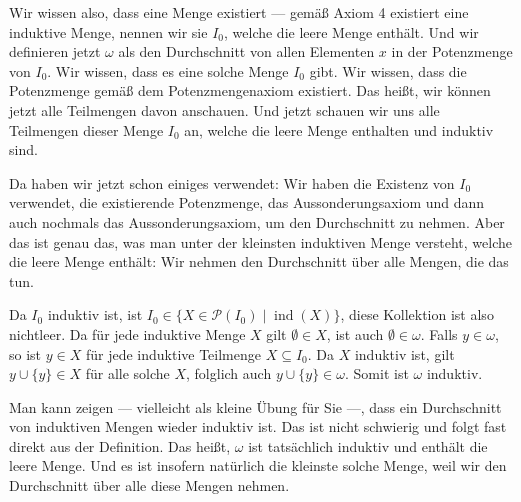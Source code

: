 \begin{spoken-clean}[00:46:16 - 00:47:57]
Wir wissen also, dass eine Menge existiert --- gemäß Axiom 4 existiert eine induktive Menge, nennen wir sie $I_0$, welche die leere Menge enthält. Und wir definieren jetzt $\omega$ als den Durchschnitt von allen Elementen $x$ in der Potenzmenge von $I_0$. Wir wissen, dass es eine solche Menge $I_0$ gibt. Wir wissen, dass die Potenzmenge gemäß dem Potenzmengenaxiom existiert. Das heißt, wir können jetzt alle Teilmengen davon anschauen. Und jetzt schauen wir uns alle Teilmengen dieser Menge $I_0$ an, welche die leere Menge enthalten und induktiv sind.

Da haben wir jetzt schon einiges verwendet: Wir haben die Existenz von $I_0$ verwendet, die existierende Potenzmenge, das Aussonderungsaxiom und dann auch nochmals das Aussonderungsaxiom, um den Durchschnitt zu nehmen. Aber das ist genau das, was man unter der kleinsten induktiven Menge versteht, welche die leere Menge enthält: Wir nehmen den Durchschnitt über alle Mengen, die das tun.
\end{spoken-clean}

\begin{math-stroke}
\begin{short-proof}
Da $I_0$ induktiv ist, ist $I_0 \in \{ X \in \mathcal{P}(I_0) \mid \operatorname{ind}(X) \}$, diese Kollektion ist also nichtleer. Da für jede induktive Menge $X$ gilt $\emptyset \in X$, ist auch $\emptyset \in \omega$.
Falls $y \in \omega$, so ist $y \in X$ für jede induktive Teilmenge $X \subseteq I_0$. Da $X$ induktiv ist, gilt $y \cup \{y\} \in X$ für alle solche $X$, folglich auch $y \cup \{y\} \in \omega$. Somit ist $\omega$ induktiv.
\end{short-proof}
\end{math-stroke}

\begin{spoken-clean}[00:47:57 - 00:49:23]
Man kann zeigen --- vielleicht als kleine Übung für Sie ---, dass ein Durchschnitt von induktiven Mengen wieder induktiv ist. Das ist nicht schwierig und folgt fast direkt aus der Definition. Das heißt, $\omega$ ist tatsächlich induktiv und enthält die leere Menge. Und es ist insofern natürlich die kleinste solche Menge, weil wir den Durchschnitt über alle diese Mengen nehmen.
\end{spoken-clean}

